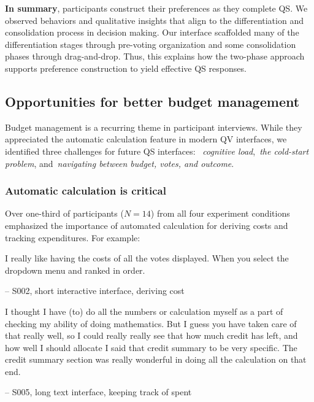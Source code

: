 \textbf{In summary}, participants construct their preferences as they complete QS. We observed behaviors and qualitative insights that align to the differentiation and consolidation process in decision making. Our interface scaffolded many of the differentiation stages through pre-voting organization and some consolidation phases through drag-and-drop. Thus, this explains how the two-phase approach supports preference construction to yield effective QS responses.

\subsection{Opportunities for better budget management}
Budget management is a recurring theme in participant interviews. While they appreciated the automatic calculation feature in modern QV interfaces, we identified three challenges for future QS interfaces: ~\textit{cognitive load},~\textit{the cold-start problem}, and~\textit{navigating between budget, votes, and outcome}.

\subsubsection{Automatic calculation is critical}
Over one-third of participants ($N=14$) from all four experiment conditions emphasized the importance of automated calculation for deriving costs and tracking expenditures. For example:

\begin{displayquote}
I really like having the costs of all the votes displayed. When you select the dropdown menu and ranked in order.

\noindent \hfill -- S002, short interactive interface, deriving cost
\end{displayquote}

\begin{displayquote}
I thought I have \bracketellipsis (to) do all the numbers or calculation myself as a part of checking my ability of doing mathematics. But I guess you have taken care of that really well, so I could really really see that how much credit has left, and \bracketellipsis how well I should allocate \bracketellipsis I said that credit summary to be very specific. The credit summary section was really wonderful in doing all the calculation on that end.

\noindent \hfill -- S005, long text interface, keeping track of spent
\end{displayquote}

